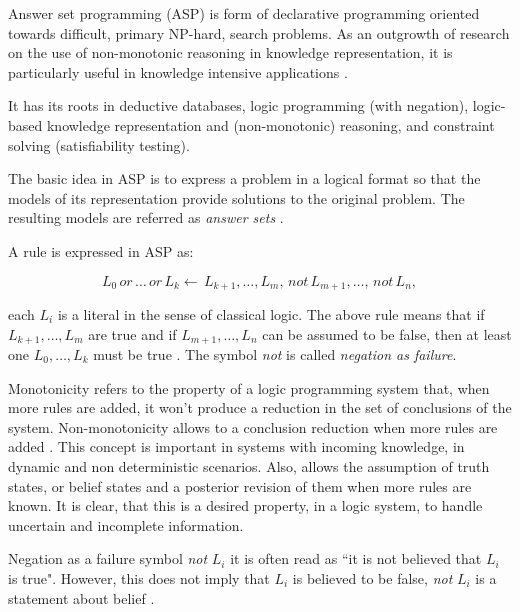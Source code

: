 Answer set programming (ASP) is form of declarative programming oriented towards difficult, primary NP-hard, search problems.
As an outgrowth of research on the use of non-monotonic reasoning in knowledge representation, it is particularly useful in knowledge intensive applications \citep{Lifschitz2008_WhatASP}. 

It has its roots in deductive databases, logic programming (with negation), logic-based knowledge representation and (non-monotonic) reasoning, and constraint solving (satisfiability testing).

The basic idea in ASP is to express a problem in a logical format so that the models of its representation provide solutions to the original problem. 
The resulting models are referred as \textit{answer sets} \citep{Gebser2013_ASP}. 



A rule is expressed in ASP as:

\begin{equation*}
L_{0} \, \textit{or} \, \dots \, \textit{or} \, L_{k} \longleftarrow \, L_{k+1} , \ldots , L_{m} , \, \textit{not} \, L_{m+1} , \ldots , \, \textit{not} \, L_{n},
\end{equation*}

each $L_{i}$ is a literal in the sense of classical logic. The above rule means that if $L_{k+1},\ldots,L_{m}$ are true and if $L_{m+1},\ldots,L_{n}$ can be assumed to be false, then at least one $L_{0},\ldots,L_{k}$ must be true \citep{Gelf88a}. The symbol \textit{not} is called \textit{negation as failure}.

Monotonicity refers to the property of a logic programming system that, when more rules are added, it won't produce a reduction in the set of conclusions of the system. 
Non-monotonicity allows to a conclusion reduction when more rules are added \citep{Poole2010_AIbook}. 
This concept is important in systems with incoming knowledge, in dynamic and non deterministic scenarios.
Also, allows the assumption of truth states, or belief states and a posterior revision of them when more rules are known.
It is clear, that this is a desired property, in a logic system, to handle uncertain and incomplete information.

Negation as a failure symbol \textit{not} $L_i$ it is often read as ``it is not believed that $L_i$ is true". 
However, this does not imply that $L_i$ is believed to be false, \textit{not} $L_i$ is a statement about belief \citep{Gelfond2014_KRRbook}.

